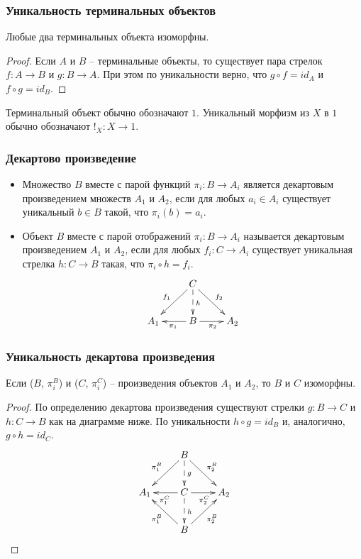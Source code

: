 \documentclass{beamer}
\theoremstyle{definition}
\begin{document}
\begin{frame}
\frametitle{Уникальность терминальных объектов}
\begin{prop}
Любые два терминальных объекта изоморфны.
\end{prop}
\begin{proof}
Если $A$ и $B$ -- терминальные объекты, то существует пара стрелок $f : A \to B$ и $g : B \to A$.
При этом по уникальности верно, что $g \circ f = id_A$ и $f \circ g = id_B$.
\end{proof}

Терминальный объект обычно обозначают $1$.
Уникальный морфизм из $X$ в $1$ обычно обозначают $!_X : X \to 1$.
\end{frame}

\begin{frame}
\frametitle{Декартово произведение}
\begin{itemize}
\item Множество $B$ вместе с парой функций $\pi_i : B \to A_i$ является декартовым произведением множеств $A_1$ и $A_2$, если для любых $a_i \in A_i$ существует уникальный $b \in B$ такой, что $\pi_i(b) = a_i$.
\item Объект $B$ вместе с парой отображений $\pi_i : B \to A_i$ называется декартовым произведением $A_1$ и $A_2$, если для любых $f_i : C \to A_i$ существует уникальная стрелка $h : C \to B$ такая, что $\pi_i \circ h = f_i$.
\[ \xymatrix{     & C \ar[ld]_{f_1} \ar@{-->}[d]^h \ar[rd]^{f_2} & \\
              A_1 & B \ar[l]^{\pi_1} \ar[r]_{\pi_2}              & A_2
            } \]
\end{itemize}
\end{frame}

\begin{frame}
\frametitle{Уникальность декартова произведения}
\begin{prop}
Если ($B$, $\pi^B_i$) и ($C$, $\pi^C_i$) -- произведения объектов $A_1$ и $A_2$, то $B$ и $C$ изоморфны.
\end{prop}
\begin{proof}
По определению декартова произведения существуют стрелки $g : B \to C$ и $h : C \to B$ как на диаграмме ниже.
По уникальности $h \circ g = id_B$ и, аналогично, $g \circ h = id_C$.
\[ \xymatrix{     & B \ar[ld]_{\pi^B_1} \ar@{-->}[d]^g \ar[rd]^{\pi^B_2} & \\
              A_1 & C \ar[l]^{\pi^C_1} \ar@{-->}[d]^h \ar[r]_{\pi^C_2}   & A_2 \\
                  & B \ar[lu]^{\pi^B_1} \ar[ru]_{\pi^B_2}                &
            } \]
\end{proof}
\end{frame}
\end{document}
